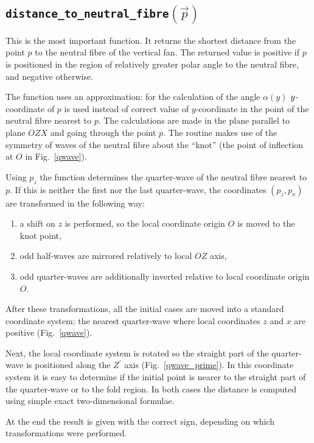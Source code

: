 \documentclass{article}
\begin{document}
\subsection{\tt distance\_to\_neutral\_fibre$(\vec{p})$}
This is the most important function.
It returns the shortest distance from the point $p$ to the neutral fibre of the
vertical fan. The returned value is positive if $p$ is positioned in
the region of relatively greater polar angle to the neutral fibre, and negative
otherwise.

The function uses an approximation: for 
the calculation of the angle $\alpha(y)$ $y\/$-coordinate of $p$ is used instead
of correct value of $y$-coordinate
 in the point of the neutral fibre nearest to $p$. 
The calculations are made in the plane parallel to plane $OZX$ and going through
the point $p$. The routine makes use of the symmetry of waves of the 
neutral fibre about the ``knot'' (the point of inflection at $O$ in
Fig.~\ref{qwave}).

Using $p_z$ the function determines the quarter-wave of the
neutral fibre nearest to $p$. If this is neither the first nor the last quarter-wave, the 
coordinates $(p_z, p_x)$ are transformed in the following way:
\begin{enumerate}
\item  a shift on $z$ is performed, so the local coordinate origin
$O$ is moved to the knot point,
\item odd half-waves are mirrored relatively to local $OZ$ axis,
\item odd quarter-waves are additionally inverted relative to
local coordinate origin $O$.
\end{enumerate}

After these transformations, all the initial cases are moved into a
standard coordinate system: the nearest quarter-wave where
local coordinates $z$ and $x$ are positive (Fig.~\ref{qwave}).



Next, the local coordinate system is rotated so the straight part of the quarter-wave
is positioned along the $Z^{\prime}$ axis (Fig.~\ref{qwave_prime}).
In this coordinate system it is easy to determine if the initial point is
nearer to
the straight part of the quarter-wave or to the fold region. In both cases the
distance is computed using simple exact two-dimensional formulae.

At the end the result is given with the correct sign, depending on
which transformations were performed.
\end{document}
